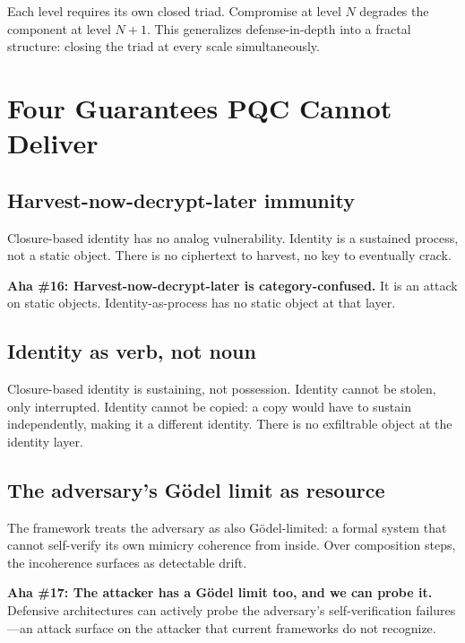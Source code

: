\documentclass[11pt,a4paper]{article}
\theoremstyle{definition}
\theoremstyle{remark}
\newcommand{\aha}[2]{\medskip\textbf{Aha \##1: #2}}
\begin{document}
Each level requires its own closed triad. Compromise at level $N$ degrades the component at level $N+1$. This generalizes defense-in-depth into a fractal structure: closing the triad at every scale simultaneously.

\section{Four Guarantees PQC Cannot Deliver}

\subsection{Harvest-now-decrypt-later immunity}

Closure-based identity has no analog vulnerability. Identity is a sustained process, not a static object. There is no ciphertext to harvest, no key to eventually crack.

\aha{16}{Harvest-now-decrypt-later is category-confused.} It is an attack on static objects. Identity-as-process has no static object at that layer.

\subsection{Identity as verb, not noun}

Closure-based identity is sustaining, not possession. Identity cannot be stolen, only interrupted. Identity cannot be copied: a copy would have to sustain independently, making it a different identity. There is no exfiltrable object at the identity layer.

\subsection{The adversary's G\"odel limit as resource}

The framework treats the adversary as also G\"odel-limited: a formal system that cannot self-verify its own mimicry coherence from inside. Over composition steps, the incoherence surfaces as detectable drift.

\aha{17}{The attacker has a G\"odel limit too, and we can probe it.} Defensive architectures can actively probe the adversary's self-verification failures---an attack surface on the attacker that current frameworks do not recognize.
\end{document}
